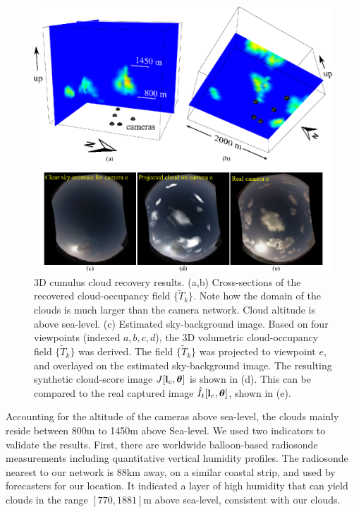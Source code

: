 \documentclass[runningheads]{llncs}
\begin{document}
\begin{figure}[t!]
\begin{center}
   \includegraphics[width=1\linewidth]{figures/clouds_reconstructions.eps}
\end{center}
   \vspace{-0.6cm}
   \caption{3D cumulus cloud recovery results. (a,b) Cross-sections of the recovered cloud-occupancy field $\{\tilde T_k\}$. Note how the domain of the clouds is much larger than the camera network. Cloud
   altitude is above sea-level. (c) Estimated sky-background image.  Based on four viewpoints (indexed $a,b,c,d$), the 3D volumetric cloud-occupancy field $\{\tilde T_k\}$ was derived. The field $\{\tilde T_k\}$ was projected to viewpoint $e$, and overlayed on the estimated sky-background image. The resulting synthetic cloud-score image $J[{\bf l}_e,{\bm \theta}]$ is shown in (d). This can be compared to the real captured image $\hat I_t[{\bf l}_e,{\bm \theta}]$, shown in (e).}
\label{fig:projection}
\end{figure}
Accounting for the altitude of the cameras above sea-level, the clouds mainly reside between 800m to 1450m above Sea-level. We used two indicators to validate the results. First, there are worldwide balloon-based radiosonde measurements including quantitative vertical humidity profiles. The radiosonde nearest to our network is 88km away, on a similar coastal strip, and used by forecasters for our location. It indicated a layer of high humidity that can yield clouds in the range $[770,1881]$m above sea-level, consistent with our clouds.
\end{document}
